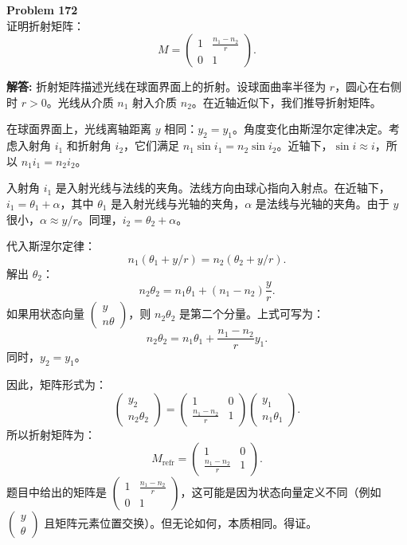 \documentclass[12pt, a4paper, oneside]{ctexart}
\newenvironment{solution}{\par\noindent\textbf{解答:}\quad}{\par}
\begin{document}
\begin{mdframed}[backgroundcolor=gray!10, linewidth=0pt]
    \textbf{Problem 172} \\
    证明折射矩阵：
    \[
    M = \begin{pmatrix} 1 & \frac{n_1 - n_2}{r} \\ 0 & 1 \end{pmatrix}.
    \]
\end{mdframed}
\begin{solution}
    折射矩阵描述光线在球面界面上的折射。设球面曲率半径为 $r$，圆心在右侧时 $r>0$。光线从介质 $n_1$ 射入介质 $n_2$。在近轴近似下，我们推导折射矩阵。

    在球面界面上，光线离轴距离 $y$ 相同：$y_2 = y_1$。角度变化由斯涅尔定律决定。考虑入射角 $i_1$ 和折射角 $i_2$，它们满足 $n_1 \sin i_1 = n_2 \sin i_2$。近轴下，$\sin i \approx i$，所以 $n_1 i_1 = n_2 i_2$。

    入射角 $i_1$ 是入射光线与法线的夹角。法线方向由球心指向入射点。在近轴下，$i_1 = \theta_1 + \alpha$，其中 $\theta_1$ 是入射光线与光轴的夹角，$\alpha$ 是法线与光轴的夹角。由于 $y$ 很小，$\alpha \approx y / r$。同理，$i_2 = \theta_2 + \alpha$。

    代入斯涅尔定律：
    \[
    n_1 (\theta_1 + y/r) = n_2 (\theta_2 + y/r).
    \]
    解出 $\theta_2$：
    \[
    n_2 \theta_2 = n_1 \theta_1 + (n_1 - n_2) \frac{y}{r}.
    \]
    如果用状态向量 $\begin{pmatrix} y \\ n\theta \end{pmatrix}$，则 $n_2 \theta_2$ 是第二个分量。上式可写为：
    \[
    n_2 \theta_2 = n_1 \theta_1 + \frac{n_1 - n_2}{r} y_1.
    \]
    同时，$y_2 = y_1$。

    因此，矩阵形式为：
    \[
    \begin{pmatrix} y_2 \\ n_2 \theta_2 \end{pmatrix} = \begin{pmatrix} 1 & 0 \\ \frac{n_1 - n_2}{r} & 1 \end{pmatrix} \begin{pmatrix} y_1 \\ n_1 \theta_1 \end{pmatrix}.
    \]
    所以折射矩阵为：
    \[
    M_{\text{refr}} = \begin{pmatrix} 1 & 0 \\ \frac{n_1 - n_2}{r} & 1 \end{pmatrix}.
    \]
    题目中给出的矩阵是 $\begin{pmatrix} 1 & \frac{n_1 - n_2}{r} \\ 0 & 1 \end{pmatrix}$，这可能是因为状态向量定义不同（例如 $\begin{pmatrix} y \\ \theta \end{pmatrix}$ 且矩阵元素位置交换）。但无论如何，本质相同。得证。
\end{solution}
\end{document}
